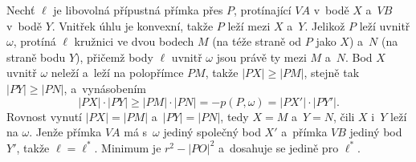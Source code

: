 {    Nechť $\ell$ je libovolná přípustná přímka přes $P$, protínající $VA$ v~bodě $X$ a~$VB$ v~bodě $Y$. Vnitřek úhlu je konvexní, takže $P$ leží mezi $X$ a~$Y$. Jelikož $P$ leží uvnitř $\omega$, protíná $\ell$ kružnici ve dvou bodech $M$ (na téže straně od $P$ jako $X$) a~$N$ (na straně bodu $Y$), přičemž body $\ell$ uvnitř $\omega$ jsou právě ty mezi $M$ a~$N$. Bod $X$ uvnitř $\omega$ neleží a~leží na polopřímce $PM$, takže $|PX| \ge |PM|$, stejně tak $|PY| \ge |PN|$, a~vynásobením
    $$
    |PX| \cdot |PY| \ge |PM| \cdot |PN| = -p(P,\omega) = |PX'| \cdot |PY'|.
    $$
    Rovnost vynutí $|PX| = |PM|$ a~$|PY| = |PN|$, tedy $X = M$ a~$Y = N$, čili $X$ i~$Y$ leží na $\omega$. Jenže přímka $VA$ má s~$\omega$ jediný společný bod $X'$ a~přímka $VB$ jediný bod $Y'$, takže $\ell = \ell^*$. Minimum je $r^2 - |PO|^2$ a~dosahuje se jedině pro $\ell^*$.
}

